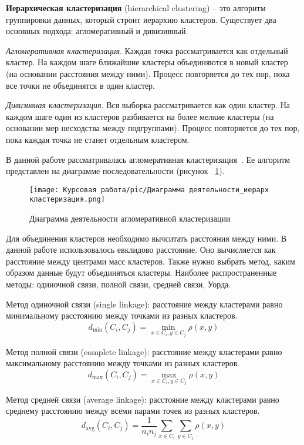  
\textbf{Иерархическая кластеризация} (hierarchical clustering) -- это алгоритм группировки данных, который строит иерархию кластеров. Существует два основных подхода: агломеративный и дивизивный.

\textit{Агломеративная кластеризация}. Каждая точка рассматривается как отдельный кластер. На каждом шаге ближайшие кластеры объединяются в новый кластер (на основании расстояния между ними). Процесс повторяется до тех пор, пока все точки не объединятся в один кластер.
    
\textit{Дивизивная кластеризация}. Вся выборка рассматривается как один кластер. На каждом шаге один из кластеров разбивается на более мелкие кластеры (на основании мер несходства между подгруппами). Процесс повторяется до тех пор, пока каждая точка не станет отдельным кластером.

В данной работе рассматривалась агломеративная кластеризация~\cite{Banfield1993ModelbasedGA}. Ее алгоритм представлен на диаграмме последовательности (рисунок ~\ref{ris:actionshier}).

\begin{figure}[H]
    \texttt{[image: Курсовая работа/pic/Диаграмма деятельности\_иерарх кластеризация.png]}
    \caption{Диаграмма деятельности агломеративной кластеризации}
    \label{ris:actionshier}
\end{figure}

Для объединения кластеров необходимо вычситать расстояния между ними. В данной работе использовалось евклидово расстояние. Оно вычисляется как расстояние между центрами масс кластеров. Также нужно выбрать метод, каким образом данные будут объединяться кластеры. Наиболее распространенные методы: одиночной связи, полной связи, средней связи, Уорда.

Метод одиночной связи (single linkage): расстояние между кластерами равно минимальному расстоянию между точками из разных кластеров.
\[ d_{\min}(C_i, C_j) = \min_{x \in C_i, y \in C_j} \rho(x, y) \]

Метод полной связи (complete linkage): расстояние между кластерами равно максимальному расстоянию между точками из разных кластеров.
\[ d_{\max}(C_i, C_j) = \max_{x \in C_i, y \in C_j} \rho(x, y) \]

Метод средней связи (average linkage): расстояние между кластерами равно среднему расстоянию между всеми парами точек из разных кластеров.
\[ d_{\text{avg}}(C_i, C_j) = \frac{1}{n_i n_j} \sum_{x \in C_i} \sum_{y \in C_j} \rho(x, y) \]

